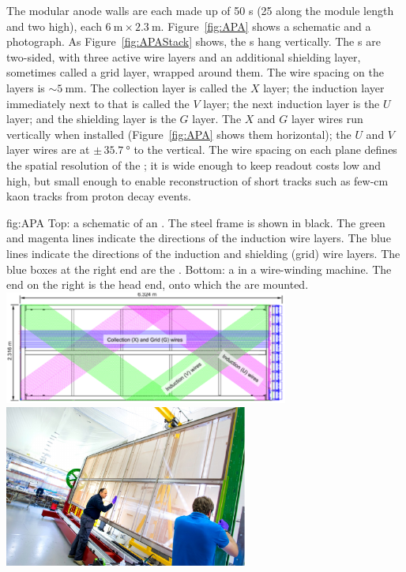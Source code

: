 The modular anode walls are each made up of 50 s (25 along the module length and two high), each $\SI{6}{\meter}\times\SI{2.3}{\meter}$. Figure~\ref{fig:APA} shows a schematic and a photograph. As Figure~\ref{fig:APAStack} shows, the s hang vertically. The s are two-sided, with three active wire layers and an additional shielding layer, sometimes called a grid layer, wrapped around them. The wire spacing on the layers is $\sim\!\SI{5}{\mm}$. The collection layer is called the $X$ layer; the induction layer immediately next to that is called the $V$ layer; the next induction layer is the $U$ layer; and the shielding layer is the $G$ layer. The $X$ and $G$ layer wires run vertically when installed  (Figure~\ref{fig:APA} shows them horizontal); the $U$ and $V$ layer wires are at $\pm\,\SI{35.7}{\degree}$ to the vertical. The 
wire spacing on each plane defines the spatial resolution of the ; it is wide enough to keep readout costs low and  high, but small enough to enable reconstruction of 
short tracks such as few-\si{\cm} kaon tracks from proton decay events.

\begin{dunefigure}{fig:APA}
{Top: a schematic of an . The steel  frame is shown in black. The green and magenta lines indicate the directions of the induction wire layers. The blue lines indicate the directions of the induction and shielding (grid) wire layers. The blue boxes at the right end  are the . Bottom: a   in a wire-winding machine. The end on the right is the head end, onto which the  are mounted.}
\includegraphics[width=0.7\textwidth]{graphics/APASchematic.pdf}
\includegraphics[width=0.6\textwidth]{graphics/RealAPA.pdf}
\end{dunefigure}

